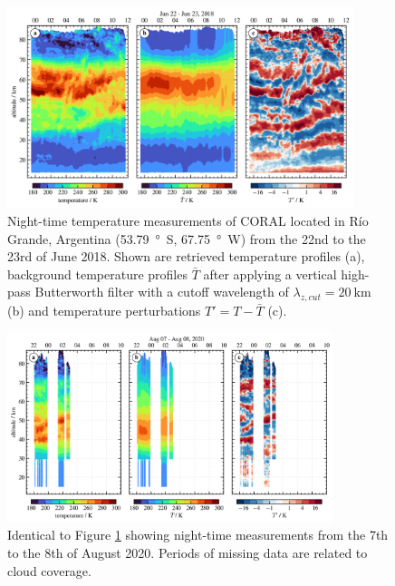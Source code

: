 \begin{figure}[t]
    \centering
    \includegraphics[width=0.9\textwidth]{figures_lidar/coral_event_20180622.png}
    \caption{Night-time temperature measurements of CORAL located in Río Grande, Argentina (\SI{53.79}{\degree S}, \SI{67.75}{\degree W}) from the 22nd to the 23rd of June 2018. Shown are retrieved temperature profiles (a), background temperature profiles $\bar{T}$ after applying a vertical high-pass Butterworth filter with a cutoff wavelength of $\lambda_{z,cut}=\SI{20}{\kilo\meter}$ (b) and temperature perturbations $T'=T-\bar{T}$ (c).}
    \label{fig:coral_2018}
\end{figure}
\begin{figure}[t]
    \centering
    \includegraphics[width=0.85\textwidth]{figures_lidar/coral_event_20200807.png}
    \caption{Identical to Figure \ref{fig:coral_2018} showing night-time measurements from the 7th to the 8th of August 2020. Periods of missing data are related to cloud coverage.}
    \label{fig:coral_2020}
\end{figure}


